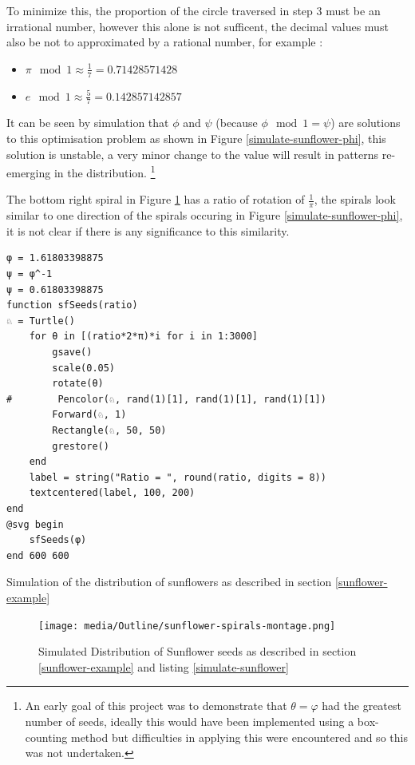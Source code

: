 \documentclass[a4paper,11pt,twoside]{article}
\begin{document}
To minimize this, the proportion of the circle traversed in step 3 must be an
irrational number, however this alone is not sufficent, the decimal values must
also be not to approximated by a rational number, for example
\cite{NatureGoldenRatio2018}:

\begin{itemize}
\item \(\pi \mod 1 \approx \frac{1}{7}=0.71428571428\)
\item \(e \mod 1 \approx \frac{5}{7}= 0.142857142857\)
\end{itemize}

It can be seen by simulation that \(\phi\) and \(\psi\) (because \(\phi \mod 1 =
\psi\)) are solutions to this optimisation problem as shown in Figure
\ref{simulate-sunflower-phi}, this solution is unstable, a very minor change to the
value will result in patterns re-emerging in the distribution. \footnote{An early goal of this project was to demonstrate that \(\theta = \varphi\) had the greatest number of seeds, ideally this would have been implemented using a box-counting method but difficulties in applying this were encountered and so this was not undertaken.}

The bottom right spiral in Figure \ref{simulate-sunflower-image} has a ratio of rotation of \(\frac{1}{\pi}\), the spirals look similar to one direction of the spirals occuring in Figure \ref{simulate-sunflower-phi}, it is not clear if there is any significance to this similarity.

\begin{listing}[htbp]
\begin{verbatim}
φ = 1.61803398875
ψ = φ^-1
ψ = 0.61803398875
function sfSeeds(ratio)
♘ = Turtle()
    for θ in [(ratio*2*π)*i for i in 1:3000]
        gsave()
        scale(0.05)
        rotate(θ)
#        Pencolor(♘, rand(1)[1], rand(1)[1], rand(1)[1])
        Forward(♘, 1)
        Rectangle(♘, 50, 50)
        grestore()
    end
    label = string("Ratio = ", round(ratio, digits = 8))
    textcentered(label, 100, 200)
end
@svg begin
    sfSeeds(φ)
end 600 600
\end{verbatim}
\caption{\label{simulate-sunflower}Simulation of the distribution of sunflowers as described in section \ref{sunflower-example}}
\end{listing}

\begin{figure}[htbp]
\centering
\texttt{[image: media/Outline/sunflower-spirals-montage.png]}
\caption{\label{simulate-sunflower-image}Simulated Distribution of Sunflower seeds as described in section \ref{sunflower-example} and listing \ref{simulate-sunflower}}
\end{figure}
\end{document}
